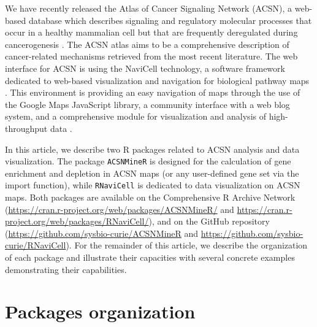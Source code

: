 \documentclass{article}
\begin{document}
We have recently released the Atlas of Cancer Signaling Network (ACSN), a
web-based database which describes signaling and regulatory molecular processes
that occur in a healthy mammalian cell but that are frequently deregulated
during cancerogenesis \cite{kuperstein2015atlas}.  The ACSN atlas aims to
be a comprehensive description of cancer-related mechanisms retrieved from the
most recent literature. The web interface for ACSN is using the NaviCell
technology, a software framework dedicated to web-based visualization and
navigation for biological pathway maps \cite{kuperstein2013navicell}. This
environment is providing an easy navigation of maps through the use of the
Google Maps JavaScript library, a community interface with a web blog system,
and a comprehensive module for visualization and analysis of high-throughput
data \cite{bonnet2015navicell}.


In this article, we describe two R packages related to ACSN analysis and
data visualization. The package \verb|ACSNMineR| is designed for the calculation of
gene enrichment and depletion in ACSN maps (or any user-defined gene set via
the import function), while \verb|RNaviCell| is dedicated to data visualization
on ACSN maps. Both packages are available on the Comprehensive R Archive
Network (\url{https://cran.r-project.org/web/packages/ACSNMineR/} and
\url{https://cran.r-project.org/web/packages/RNaviCell/}), and on the GitHub
repository (\url{https://github.com/sysbio-curie/ACSNMineR} and
\url{https://github.com/sysbio-curie/RNaviCell}). For the remainder of this
article, we describe the organization of each package and illustrate their
capacities with several concrete examples demonstrating their capabilities. 

\section[Packages organization]{Packages organization}
\end{document}
